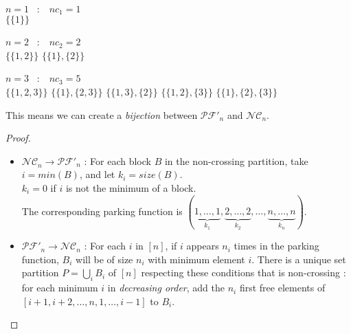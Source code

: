 \begin{example}[$n = 1, 2, 3$]
    ~\\
    \begin{itemize*}
        \item $n = 1$ \  $:$ \  $nc_1 = 1$\\
        \subitem $\{\{1\}\}$\\
        \item $n = 2$ \  $:$ \  $nc_2 = 2$\\
        \subitem $\{\{1, 2\}\}$
        \subitem $\{\{1\}, \{2\}\}$\\
        \item $n = 3$ \  $:$ \  $nc_3 = 5$\\
        \subitem $\{\{1, 2, 3\}\}$
        \subitem $\{\{1\}, \{2, 3\}\}$
        \subitem $\{\{1, 3\}, \{2\}\}$
        \subitem $\{\{1, 2\}, \{3\}\}$
        \subitem $\{\{1\}, \{2\}, \{3\}\}$\\
    \end{itemize*}
\end{example}

\begin{prop}
    This means we can create a \emph{bijection} between
    $\mathcal{PF'}_n$ and $\mathcal{NC}_n$.
\end{prop}

\begin{proof}
    ~\\
\begin{itemize}
    \item $\mathcal{NC}_n \to \mathcal{PF'}_n$ :
    For each block $B$ in the non-crossing partition, take
    $i = min (B)$, and let $k_i = size (B)$.\\
    $k_i = 0$ if $i$ is not the minimum of a block.\\
    The corresponding parking function is
    $(\underbrace{1, \ldots, 1}_{k_1}, \underbrace{2, \ldots,
    2}_{k_2}, \ldots, \underbrace{n, \ldots, n}_{k_n})$.\\
    \item $\mathcal{PF'}_n \to \mathcal{NC}_n$ :
    For each $i$ in $[n]$, if $i$ appears $n_i$ times in the
    parking function, $B_i$ will be of size $n_i$ with minimum
    element $i$.
    There is a unique set partition $\displaystyle P = \bigcup_{i}{B_i}$
    of $[n]$ respecting these conditions that is non-crossing :
    for each minimum $i$ in \emph{decreasing order}, add
    the $n_i$ first free elements of
    $[i+1, i+2, \ldots, n, 1, \ldots, i-1]$ to $B_i$.
\end{itemize}
\end{proof}

